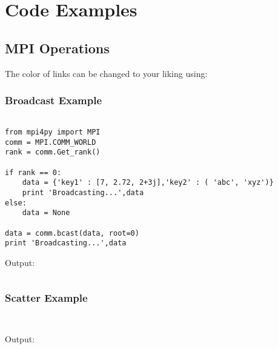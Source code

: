 
\chapter{Code Examples} %

\label{AppendixA} %

\section{MPI Operations}

The color of links can be changed to your liking using:
%
%
%
%
%
%
%
%

\subsection {Broadcast Example}
\begin{verbatim}

from mpi4py import MPI
comm = MPI.COMM_WORLD
rank = comm.Get_rank()

if rank == 0:
	data = {'key1' : [7, 2.72, 2+3j],'key2' : ( 'abc', 'xyz')}
	print 'Broadcasting...',data
else:
	data = None
	
data = comm.bcast(data, root=0)
print 'Broadcasting...',data

\end{verbatim}

Output:

\begin{verbatim}

\end{verbatim}

\subsection {Scatter Example}
\begin{verbatim}


\end{verbatim}

Output:

